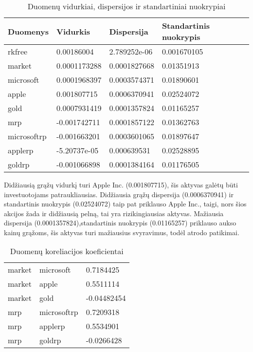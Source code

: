 \documentclass[12pt, a14paper, lithuanian]{article}
\begin{document}
\begin{table}[ht]
\begin{center}
    \begin{tabular}{ | l | l | l | l |}
    \hline
    Duomenys & Vidurkis & Dispersija & Standartinis nuokrypis \\
    \hline
    rkfree & 0.00186004 & 2.789252e-06 & 0.001670105 \\
    market & 0.0001173288 & 0.0001827668 & 0.01351913 \\
    microsoft & 0.0001968397 & 0.0003574371 & 0.01890601 \\
    apple & 0.001807715 & 0.0006370941 & 0.02524072 \\  
    gold & 0.0007931419 & 0.0001357824 & 0.01165257 \\
    mrp & -0.001742711 & 0.0001857122 & 0.01362763 \\
    microsoftrp & -0.001663201 & 0.0003601065 & 0.01897647 \\
    applerp & -5.20737e-05 & 0.000639531 & 0.02528895 \\
    goldrp & -0.001066898 & 0.0001384164 & 0.01176505 \\
    \hline
    \end{tabular}
\end{center}
\caption{Duomenų vidurkiai, dispersijos ir standartiniai nuokrypiai}
\end{table}




Didžiausią grąžų vidurkį turi Apple Inc. (0.001807715), šis aktyvas galėtų būti investuotojams patraukliausias.
Didžiausia grąžų dispersija (0.0006370941) ir standartinis nuokrypis (0.02524072) taip pat priklauso Apple Inc., taigi, nors šios akcijos žada ir didžiausią pelną, tai yra rizikingiausias aktyvas.
Mažiausia dispersija (0.0001357824),standartinis nuokrypis (0.01165257) priklauso aukso kainų grąžoms, šis aktyvas turi mažiausius svyravimus, todėl atrodo patikimai.


\begin{table}[ht]
\begin{center}
    \begin{tabular}{ | l | l | l | }
    \hline
    market & microsoft & 0.7184425 \\
	market & apple & 0.5511114 \\
	market & gold & -0.04482454 \\
	mrp & microsoftrp & 0.7209318 \\
	mrp & applerp & 0.5534901 \\
	mrp & goldrp & -0.0266428 \\
	\hline
    \end{tabular}
\end{center}
\caption{Duomenų koreliacijos koeficientai}
\end{table}
\end{document}
